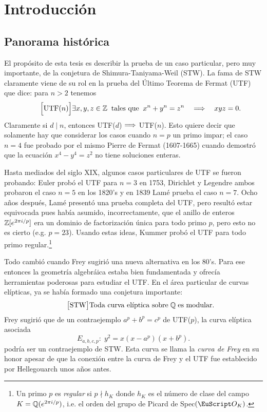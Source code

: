 \documentclass[../../tesis_maestria]{subfiles}
\begin{document}
\section{Introducci\'on}

\subsection*{Panorama hist\'orica}

El prop\'osito de esta tesis es describir la prueba de un caso particular, pero muy importante,
de la conjetura de Shimura-Taniyama-Weil (STW). La fama de STW claramente viene de su rol en la
prueba del \'Ultimo Teorema de Fermat (UTF) que dice: para $n>2$ tenemos
\begin{equation}\tag*{$\Big[\mathrm{UTF}(n)\Big]$}
  \exists x,y,z\in\ZZ\;\;\text{tales que}\;\; x^n+y^n=z^n\quad\then\quad xyz=0.
\end{equation}
Claramente si $d\mid n$, entonces UTF($d$) $\Longrightarrow$ UTF($n$). Esto quiere decir que solamente hay
que considerar los casos cuando $n=p$ un primo impar; el caso $n=4$ fue probado por el mismo Pierre
de Fermat (1607-1665) cuando demostr\'o que la ecuaci\'on $x^4-y^4=z^2$ no tiene soluciones enteras.

Hasta mediados del siglo XIX, algunos casos particulares de UTF se fueron probando:
Euler prob\'o el UTF para $n=3$ en 1753, Dirichlet y Legendre ambos probaron el caso $n=5$ en los
1820's y en 1839 Lam\'e prueba el caso $n=7$. Ocho a\~nos despu\'es, Lam\'e present\'o una
prueba completa del UTF, pero result\'o estar equivocada pues hab\'ia asumido, incorrectamente,
que el anillo de enteros $\mathbb{Z}[e^{2\pi i/p}]$ era un dominio de factorizaci\'on \'unica para todo
primo $p$, pero esto no es cierto (e.g. $p=23$). Usando estas ideas, Kummer prob\'o el UTF para
todo primo regular.\footnote{Un primo $p$ es \emph{regular} si $p\nmid h_K$ donde $h_K$ es el
  n\'umero de clase del campo $K=\mathbb{Q}(e^{2\pi i/p})$, i.e. el orden del grupo de Picard de
  Spec$(\Oo_K)$.}

Todo cambi\'o cuando Frey sugiri\'o una nueva alternativa en los 80's. Para ese entonces la
geometr\'ia algebr\'aica estaba bien fundamentada y ofrec\'ia herramientas poderosas para estudiar
el UTF. En el \'area particular de curvas el\'ipticas, ya se hab\'ia formado una conjetura
importante:
\begin{equation}\tag*{$\big[\mathrm{STW}\big]$}
  \text{Toda curva el\'iptica sobre}\;\QQ\;\text{es modular.}
\end{equation}
Frey sugiri\'o que de un contraejemplo $a^p+b^p=c^p$ de UTF($p$), la curva el\'iptica asociada
\[
  E_{a,b,c,p}:\; y^2=x(x-a^p)(x+b^p).
\]
podr\'ia ser un contraejemplo de STW. Esta curva se llama la \emph{curva de Frey} en su honor
apesar de que la conexi\'on entre la curva de Frey y el UTF fue establecido por Hellegouarch
unos a\~nos antes.
\end{document}
